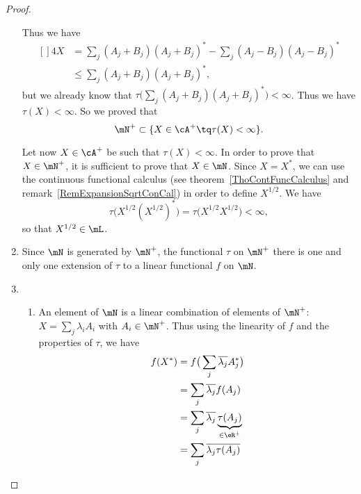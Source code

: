 \begin{proof}
\begin{enumerate}
		      Thus we have
		      \begin{equation}
			      \begin{aligned}[]
				      4X & =\sum_j(A_j+B_j)(A_j+B_j)^*-\sum_j(A_j-B_j)(A_j-B_j)^* \\
				         & \leq\sum_j(A_j+B_j)(A_j+B_j)^*,
			      \end{aligned}
		      \end{equation}
		      but we already know that $\tau\big( \sum_j(A_j+B_j)(A_j+B_j)^* \big)<\infty$. Thus we have $\tau(X)<\infty$. So we proved that
		      \begin{equation}
			      \mN^+\subset\{ X\in\cA^+\tq\tau(X)<\infty \}.
		      \end{equation}

		      Let now $X\in\cA^+$ be such that $\tau(X)<\infty$. In order to prove that $X\in\mN^+$, it is sufficient to prove that $X\in\mN$. Since $X=X^*$, we can use the continuous functional calculus (see theorem~\ref{ThoContFuncCalculus} and remark~\ref{RemExpansionSqrtConCal}) in order to define $X^{1/2}$. We have
		      \begin{equation}
			      \tau\big( X^{1/2}(X^{1/2})^* \big)=\tau\big( X^{1/2}X^{1/2} \big)<\infty,
		      \end{equation}
		      so that $X^{1/2}\in\mL$.
		\item
		      Since $\mN$ is generated by $\mN^{+}$, the functional $\tau$ on $\mN^+$ there is one and only one extension of $\tau$ to a linear functional $f$ on $\mN$.
		\item
		      \begin{enumerate}
			      \item
			            An element of $\mN$ is a linear combination of elements of $\mN^+$: $X=\sum_j\lambda_iA_i$ with $A_i\in\mN^+$. Thus using the linearity of $f$ and the properties of $\tau$, we have
			            \begin{equation}
				            \begin{aligned}[]
					            f(X^*) & =f\big( \sum_j\overline{ \lambda_j }A_j^* \big)                  \\
					                   & =\sum_j\overline{ \lambda_j }f(A_j)                              \\
					                   & =\sum_j\overline{ \lambda_j }\underbrace{\tau(A_j)}_{\in\eR^{+}} \\
					                   & =\sum_j\overline{ \lambda_j \tau(A_j)}                           \\

\end{aligned}
\end{equation}
\end{enumerate}
\end{enumerate}
\end{proof}
